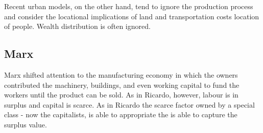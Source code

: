 


Recent urban models, on the other hand, tend to ignore the production process and consider the locational implications of land and transportation costs location of people. Wealth distribution is often ignored. 

\subsection{Marx}


 Marx shifted attention to the manufacturing economy in which the owners contributed the machinery, buildings, and even working capital to fund the workers until the product can be sold. %
As in Ricardo, however, labour is in surplus and capital is scarce. As in Ricardo the scarce factor owned by a special class - now the capitalists, is able to appropriate the is able to capture the surplus value. %

